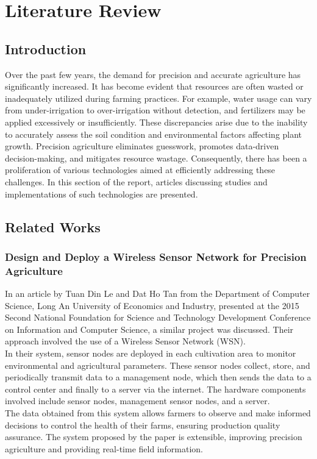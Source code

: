 \documentclass[12pt, a4paper]{article}
\begin{document}
\section{Literature Review}
\subsection{Introduction}
Over the past few years, the demand for precision and accurate agriculture has significantly increased. It has become evident that resources are often wasted or inadequately utilized during farming practices. For example, water usage can vary from under-irrigation to over-irrigation without detection, and fertilizers may be applied excessively or insufficiently. These discrepancies arise due to the inability to accurately assess the soil condition and environmental factors affecting plant growth. Precision agriculture eliminates guesswork, promotes data-driven decision-making, and mitigates resource wastage. Consequently, there has been a proliferation of various technologies aimed at efficiently addressing these challenges. In this section of the report, articles discussing studies and implementations of such technologies are presented.

\subsection{Related Works}
\subsubsection{Design and Deploy a Wireless Sensor Network for Precision Agriculture}
In an article by Tuan Din Le and Dat Ho Tan \cite{7302210} from the Department of Computer Science, Long An University of Economics and Industry, presented at the 2015 Second National Foundation for Science and Technology Development Conference on Information and Computer Science, a similar project was discussed. Their approach involved the use of a Wireless Sensor Network (WSN).\\
In their system, sensor nodes are deployed in each cultivation area to monitor environmental and agricultural parameters. These sensor nodes collect, store, and periodically transmit data to a management node, which then sends the data to a control center and finally to a server via the internet. The hardware components involved include sensor nodes, management sensor nodes, and a server.\\
The data obtained from this system allows farmers to observe and make informed decisions to control the health of their farms, ensuring production quality assurance. The system proposed by the paper is extensible, improving precision agriculture and providing real-time field information.
\end{document}
